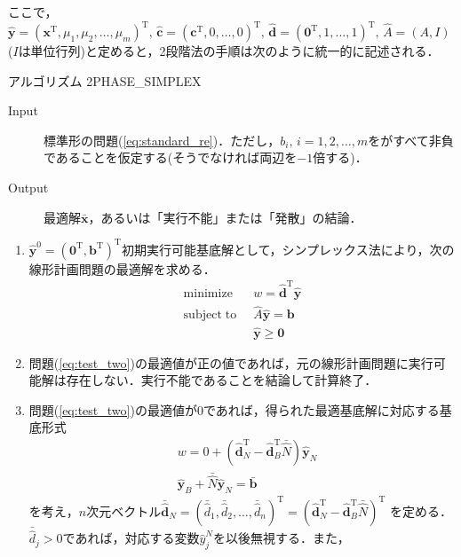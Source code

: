 \documentclass{jsreport}
\begin{document}
ここで，$\hat{\bm{y}} = (\bm{x}^{\mathrm{T}}, \mu_1, \mu_2, \ldots, \mu_m)^{\mathrm{T}}, \,
\hat{\bm{c}} = (\bm{c}^{\mathrm{T}}, 0, \ldots, 0)^{\mathrm{T}}, \,
\hat{\bm{d}} = (\bm{0}^{\mathrm{T}}, 1, \ldots, 1)^{\mathrm{T}}, \,
\hat{A} = (A, I)$($I$は単位行列)と定めると，2段階法の手順は次のように統一的に記述される．

\begin{itembox}[l]{アルゴリズム 2PHASE\_SIMPLEX}
  \begin{description}
    \item[Input] 標準形の問題(\ref{eq:standard_re})．ただし，$b_i, \, i = 1, 2, \ldots, m$をがすべて非負であることを仮定する(そうでなければ両辺を$-1$倍する)．
    \item[Output] 最適解$\bar{\bm{x}}$，あるいは「実行不能」または「発散」の結論．
  \end{description}
  \begin{enumerate}
    \item $\hat{\bm{y}}^0 = (\bm{0}^{\mathrm{T}},\bm{b}^{\mathrm{T}})^{\mathrm{T}}$初期実行可能基底解として，シンプレックス法により，次の線形計画問題の最適解を求める．
    \begin{align}\label{eq:test_two}
      \mathrm{minimize} \; \; &w = \hat{\bm{d}}^{\mathrm{T}} \hat{\bm{y}} \nonumber \\
      \mathrm{subject \; to} \; \; &\hat{A}\hat{\bm{y}} = \bm{b} \\
      &\hat{\bm{y}} \geq \bm{0} \nonumber
    \end{align}
    \item 問題(\ref{eq:test_two})の最適値が正の値であれば，元の線形計画問題に実行可能解は存在しない．実行不能であることを結論して計算終了．
    \item 問題(\ref{eq:test_two})の最適値が$0$であれば，得られた最適基底解に対応する基底形式
    \begin{align}\label{eq:two_basic}
      &w = 0 + (\hat{\bm{d}}_N^{\mathrm{T}} - \hat{\bm{d}}_B^{\mathrm{T}}\bar{\hat{N}}) \hat{\bm{y}}_N \nonumber \\
      &\hat{\bm{y}}_B + \bar{\hat{N}}\hat{\bm{y}}_N = \bar{\bm{b}}
    \end{align}
    を考え，$n$次元ベクトル$\bar{\hat{\bm{d}}}_N = (\bar{\hat{d}}_1, \bar{\hat{d}}_2, \ldots, \bar{\hat{d}}_n)^{\mathrm{T}} = (\hat{\bm{d}}_N^{\mathrm{T}} - \hat{\bm{d}}_B^{\mathrm{T}}\bar{\hat{N}})^{\mathrm{T}}$
    を定める．$\bar{\hat{d}}_j > 0$であれば，対応する変数$\hat{y}_j^N$を以後無視する．また，

  \end{enumerate}
\end{itembox}
\end{document}
